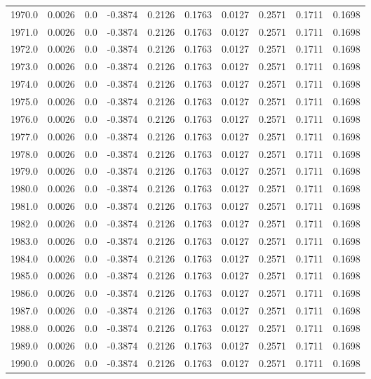 \begin{longtable}{lrrrrrrrrr}
1970.0 & 0.0026 & 0.0 & -0.3874 & 0.2126 & 0.1763 & 0.0127 & 0.2571 & 0.1711 & 0.1698 \\
1971.0 & 0.0026 & 0.0 & -0.3874 & 0.2126 & 0.1763 & 0.0127 & 0.2571 & 0.1711 & 0.1698 \\
1972.0 & 0.0026 & 0.0 & -0.3874 & 0.2126 & 0.1763 & 0.0127 & 0.2571 & 0.1711 & 0.1698 \\
1973.0 & 0.0026 & 0.0 & -0.3874 & 0.2126 & 0.1763 & 0.0127 & 0.2571 & 0.1711 & 0.1698 \\
1974.0 & 0.0026 & 0.0 & -0.3874 & 0.2126 & 0.1763 & 0.0127 & 0.2571 & 0.1711 & 0.1698 \\
1975.0 & 0.0026 & 0.0 & -0.3874 & 0.2126 & 0.1763 & 0.0127 & 0.2571 & 0.1711 & 0.1698 \\
1976.0 & 0.0026 & 0.0 & -0.3874 & 0.2126 & 0.1763 & 0.0127 & 0.2571 & 0.1711 & 0.1698 \\
1977.0 & 0.0026 & 0.0 & -0.3874 & 0.2126 & 0.1763 & 0.0127 & 0.2571 & 0.1711 & 0.1698 \\
1978.0 & 0.0026 & 0.0 & -0.3874 & 0.2126 & 0.1763 & 0.0127 & 0.2571 & 0.1711 & 0.1698 \\
1979.0 & 0.0026 & 0.0 & -0.3874 & 0.2126 & 0.1763 & 0.0127 & 0.2571 & 0.1711 & 0.1698 \\
1980.0 & 0.0026 & 0.0 & -0.3874 & 0.2126 & 0.1763 & 0.0127 & 0.2571 & 0.1711 & 0.1698 \\
1981.0 & 0.0026 & 0.0 & -0.3874 & 0.2126 & 0.1763 & 0.0127 & 0.2571 & 0.1711 & 0.1698 \\
1982.0 & 0.0026 & 0.0 & -0.3874 & 0.2126 & 0.1763 & 0.0127 & 0.2571 & 0.1711 & 0.1698 \\
1983.0 & 0.0026 & 0.0 & -0.3874 & 0.2126 & 0.1763 & 0.0127 & 0.2571 & 0.1711 & 0.1698 \\
1984.0 & 0.0026 & 0.0 & -0.3874 & 0.2126 & 0.1763 & 0.0127 & 0.2571 & 0.1711 & 0.1698 \\
1985.0 & 0.0026 & 0.0 & -0.3874 & 0.2126 & 0.1763 & 0.0127 & 0.2571 & 0.1711 & 0.1698 \\
1986.0 & 0.0026 & 0.0 & -0.3874 & 0.2126 & 0.1763 & 0.0127 & 0.2571 & 0.1711 & 0.1698 \\
1987.0 & 0.0026 & 0.0 & -0.3874 & 0.2126 & 0.1763 & 0.0127 & 0.2571 & 0.1711 & 0.1698 \\
1988.0 & 0.0026 & 0.0 & -0.3874 & 0.2126 & 0.1763 & 0.0127 & 0.2571 & 0.1711 & 0.1698 \\
1989.0 & 0.0026 & 0.0 & -0.3874 & 0.2126 & 0.1763 & 0.0127 & 0.2571 & 0.1711 & 0.1698 \\
1990.0 & 0.0026 & 0.0 & -0.3874 & 0.2126 & 0.1763 & 0.0127 & 0.2571 & 0.1711 & 0.1698 \\

\end{longtable}
